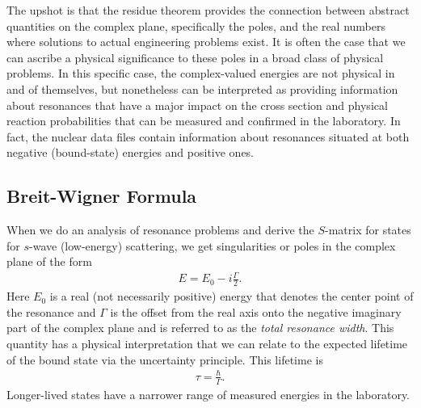 The upshot is that the residue theorem provides the connection between abstract quantities on the complex plane, specifically the poles, and the real numbers where solutions to actual engineering problems exist. It is often the case that we can ascribe a physical significance to these poles in a broad class of physical problems. In this specific case, the complex-valued energies are not physical in and of themselves, but nonetheless can be interpreted as providing information about resonances that have a major impact on the cross section and physical reaction probabilities that can be measured and confirmed in the laboratory. In fact, the nuclear data files contain information about resonances situated at both negative (bound-state) energies and positive ones.

\subsection{Breit-Wigner Formula}

When we do an analysis of resonance problems and derive the $S$-matrix for states for $s$-wave (low-energy) scattering, we get singularities or poles in the complex plane of the form
\begin{align}
  E = E_0 - i \frac{\Gamma}{2} .
\end{align}
Here $E_0$ is a real (not necessarily positive) energy that denotes the center point of the resonance and $\Gamma$ is the offset from the real axis onto the negative imaginary part of the complex plane and is referred to as the \emph{total resonance width}. This quantity has a physical interpretation that we can relate to the expected lifetime of the bound state via the uncertainty principle. This lifetime is
\begin{align}
  \tau = \frac{\hbar}{\Gamma}.
\end{align}
Longer-lived states have a narrower range of measured energies in the laboratory.

